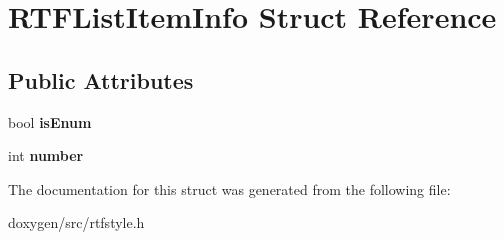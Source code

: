 \hypertarget{struct_r_t_f_list_item_info}{}\section{R\+T\+F\+List\+Item\+Info Struct Reference}
\label{struct_r_t_f_list_item_info}
\subsection*{Public Attributes}
\begin{DoxyCompactItemize}
\item 
\mbox{\label{struct_r_t_f_list_item_info_abaf669c631b6ebc6e2ffd39907e12a89}} 
bool {\bfseries is\+Enum}
\item 
\mbox{\label{struct_r_t_f_list_item_info_ad63139d761c9e72a3547780932056831}} 
int {\bfseries number}
\end{DoxyCompactItemize}


The documentation for this struct was generated from the following file\+:\begin{DoxyCompactItemize}
\item 
doxygen/src/rtfstyle.\+h\end{DoxyCompactItemize}
